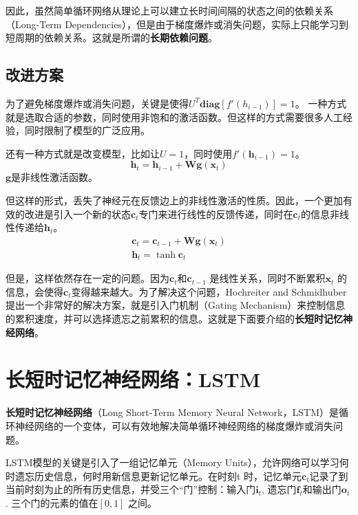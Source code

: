 \documentclass[11pt,fleqn, UTF8]{ctexbook} %
\begin{document}
因此，虽然简单循环网络从理论上可以建立长时间间隔的状态之间的依赖关系（Long-Term Dependencies），但是由于梯度爆炸或消失问题，实际上只能学习到短周期的依赖关系。这就是所谓的\textbf{长期依赖问题}。
\subsection{改进方案}
为了避免梯度爆炸或消失问题，关键是使得$U^T\boldsymbol{diag}[f'(h_{i-1})] = 1$。 一种方式就是选取合适的参数，同时使用非饱和的激活函数。但这样的方式需要很多人工经验，同时限制了模型的广泛应用。

还有一种方式就是改变模型，比如让$U = 1$，同时使用$f′(\boldsymbol{h}_{i-1}) = 1$。
\begin{equation}\label{7.11}
  \boldsymbol{h}_t=\boldsymbol{h}_{i-1}+\boldsymbol{W}\boldsymbol{g}(\boldsymbol{x}_t)
\end{equation}
$\boldsymbol{g}$是非线性激活函数。

但这样的形式，丢失了神经元在反馈边上的非线性激活的性质。因此，一个更加有效的改进是引入一个新的状态$\boldsymbol{c}_t$专门来进行线性的反馈传递，同时在$\boldsymbol{c}_t$的信息非线性传递给$\boldsymbol{h}_t$。
\begin{gather}\label{7.12}
  \boldsymbol{c}_t=\boldsymbol{c}_{t-1}+\boldsymbol{W}\boldsymbol{g}(\boldsymbol{x}_t) \\
  \boldsymbol{h}_t=\tanh{\boldsymbol{c}_t}
\end{gather}

但是，这样依然存在一定的问题。因为$\boldsymbol{c}_t$和$\boldsymbol{c}_{t-1}$ 是线性关系，同时不断累积$\boldsymbol{x}_t$ 的信息，会使得$\boldsymbol{c}_t$变得越来越大。为了解决这个问题，Hochreiter and Schmidhuber\cite{hochreiter1997long} 提出一个非常好的解决方案，就是引入门机制（Gating Mechanism）来控制信息的累积速度，并可以选择遗忘之前累积的信息。这就是下面要介绍的\textbf{长短时记忆神经网络}。
\section{长短时记忆神经网络：LSTM}

\textbf{长短时记忆神经网络}（Long Short-Term Memory Neural Network，LSTM）\cite{hochreiter1997long}是循环神经网络的一个变体，可以有效地解决简单循环神经网络的梯度爆炸或消失问题。

LSTM模型的关键是引入了一组记忆单元（Memory Units），允许网络可以学习何时遗忘历史信息，何时用新信息更新记忆单元。在时刻t 时，记忆单元$\boldsymbol{c}_t$记录了到当前时刻为止的所有历史信息，并受三个“门”控制：输入门$\boldsymbol{i}_t$, 遗忘门$\boldsymbol{f}_t$和输出门$\boldsymbol{o}_t$. 三个门的元素的值在$[0,1]$ 之间。
\end{document}
